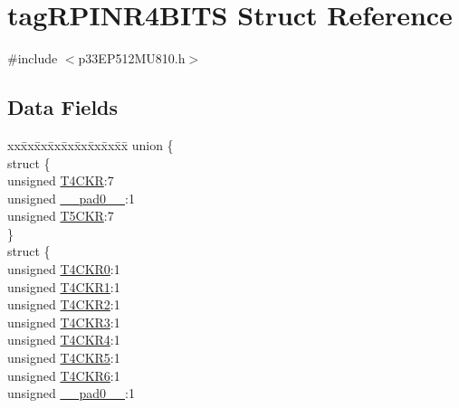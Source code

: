 \hypertarget{structtag_r_p_i_n_r4_b_i_t_s}{}\section{tag\+R\+P\+I\+N\+R4\+B\+I\+TS Struct Reference}
\label{structtag_r_p_i_n_r4_b_i_t_s}


{\ttfamily \#include $<$p33\+E\+P512\+M\+U810.\+h$>$}

\subsection*{Data Fields}
\begin{DoxyCompactItemize}
\item 
\begin{tabbing}
xx\=xx\=xx\=xx\=xx\=xx\=xx\=xx\=xx\=\kill
union \{\\
\>struct \{\\
\>\>unsigned \hyperlink{structtag_r_p_i_n_r4_b_i_t_s_a38c256d6cf9272f895c0de1043fb3e77}{T4CKR}:7\\
\>\>unsigned \hyperlink{structtag_r_p_i_n_r4_b_i_t_s_adf71f3d8410c1f1dbbc96680a92c49af}{\_\_pad0\_\_}:1\\
\>\>unsigned \hyperlink{structtag_r_p_i_n_r4_b_i_t_s_a10652604e15e269097986f4c2bcea9e0}{T5CKR}:7\\
\>\} \\
\>struct \{\\
\>\>unsigned \hyperlink{structtag_r_p_i_n_r4_b_i_t_s_a891cc1e3b56adf45e94105d82a5b9582}{T4CKR0}:1\\
\>\>unsigned \hyperlink{structtag_r_p_i_n_r4_b_i_t_s_a8215bc0c50b047700310bf4473cbf047}{T4CKR1}:1\\
\>\>unsigned \hyperlink{structtag_r_p_i_n_r4_b_i_t_s_ad58981b57a3d56384c37e2c8365bc0c0}{T4CKR2}:1\\
\>\>unsigned \hyperlink{structtag_r_p_i_n_r4_b_i_t_s_a5c549b778b5100b16e7feb397fc8ef60}{T4CKR3}:1\\
\>\>unsigned \hyperlink{structtag_r_p_i_n_r4_b_i_t_s_a90183408ff27f0d8794efceacf2d3ca2}{T4CKR4}:1\\
\>\>unsigned \hyperlink{structtag_r_p_i_n_r4_b_i_t_s_af9a0d22e16240d869a7c35ea58255e75}{T4CKR5}:1\\
\>\>unsigned \hyperlink{structtag_r_p_i_n_r4_b_i_t_s_a861b90a71c11ae6b1566607c6ea29db2}{T4CKR6}:1\\
\>\>unsigned \hyperlink{structtag_r_p_i_n_r4_b_i_t_s_adf71f3d8410c1f1dbbc96680a92c49af}{\_\_pad0\_\_}:1\\

\end{tabbing}
\end{DoxyCompactItemize}
